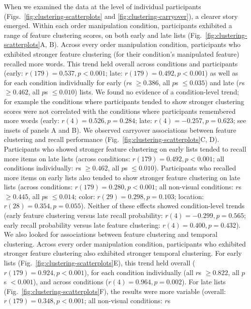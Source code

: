 \documentclass[11pt]{article}
\begin{document}
When we examined the data at the level of individual participants
(Figs.~\ref{fig:clustering-scatterplots} and \ref{fig:clustering-carryover}), a
clearer story emerged. Within each order manipulation condition, participants
exhibited a range of feature clustering scores, on both early and late lists
(Fig.~\ref{fig:clustering-scatterplots}A, B). Across every order manipulation
condition, participants who exhibited stronger feature clustering (for their
condition's manipulated feature) recalled more words. This trend held overall
across conditions and participants (early: $r(179) = 0.537, p < 0.001$; late: $
r(179) = 0.492, p < 0.001$) as well as for each condition individually for
early ($r$s $\geq 0.386$, all $p$s $\leq 0.035$) and late ($r$s $\geq 0.462$,
all $p$s $\leq 0.010$) lists. We found no evidence of a condition-level trend;
for example the conditions where participants tended to show stronger
clustering scores were not correlated with the conditions where participants
remembered more words (early: $r(4) = 0.526, p = 0.284$; late: $r(4) = -0.257,
p = 0.623$; see insets of panels A and B). We observed carryover associations
between feature clustering and recall performance
(Fig.~\ref{fig:clustering-scatterplots}C, D). Participants who showed stronger
feature clustering on early lists tended to recall more items on late lists
(across conditions: $r(179) = 0.492, p < 0.001$; all conditions individually:
$r$s $\geq 0.462$, all $p$s $\leq 0.010$). Participants who recalled more items
on early lists also tended to show stronger feature clustering on late lists
(across conditions: $r(179) = 0.280, p < 0.001$; all non-visual conditions:
$r$s $\geq 0.445$, all $p$s $\leq 0.014$; color: $r(29) = 0.298, p = 0.103$;
location: $r(28) = 0.354, p = 0.055$). Neither of these effects showed
condition-level trends (early feature clustering versus late recall
probability: $r(4) = -0.299, p = 0.565$; early recall probability versus late
feature clustering: $r(4) = 0.400, p = 0.432$). We also looked for associations
between feature clustering and temporal clustering. Across every order
manipulation condition, participants who exhibited stronger feature clustering
also exhibited stronger temporal clustering. For early lists
(Fig.~\ref{fig:clustering-scatterplots}E), this trend held
overall ($r(179) = 0.924, p < 0.001$), for each condition individually (all
$r$s $\geq 0.822$, all $p$s $< 0.001$), and across conditions ($r(4) = 0.964, p
= 0.002$). For late lists
(Fig.~\ref{fig:clustering-scatterplots}F), the results were more
variable (overall: $r(179) = 0.348, p < 0.001$; all non-visual conditions: $r$s
\end{document}
